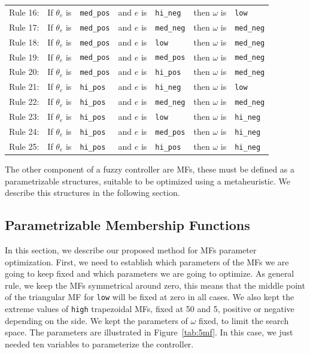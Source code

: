 \documentclass[symmetry,article,submit,moreauthors,pdftex]{Definitions/mdpi}
\begin{document}
\begin{specialtable}[H]
\begin{tabular}{lllllll}
    Rule 16: & If $\theta_e$ is	& { \tt med\_pos} &	and $e$ is	& { \tt hi\_neg}  &	then $\omega$ is & { \tt low}      \\
    Rule 17: & If $\theta_e$ is	& { \tt med\_pos} &	and $e$ is	& { \tt med\_neg} &	then $\omega$ is & { \tt med\_neg} \\
    Rule 18: & If $\theta_e$ is	& { \tt med\_pos} &	and $e$ is	& { \tt low}      &	then $\omega$ is & { \tt med\_neg} \\
    Rule 19: & If $\theta_e$ is	& { \tt med\_pos} &	and $e$ is	& { \tt med\_pos} &	then $\omega$ is & { \tt med\_neg} \\
    Rule 20: & If $\theta_e$ is	& { \tt med\_pos} &	and $e$ is  & { \tt hi\_pos}  &	then $\omega$ is & { \tt med\_neg} \\
    Rule 21: & If $\theta_e$ is	& { \tt hi\_pos}  &	and $e$ is	& { \tt hi\_neg}  &	then $\omega$ is & { \tt low}      \\
    Rule 22: & If $\theta_e$ is	& { \tt hi\_pos}  &	and $e$ is	& { \tt med\_neg} &	then $\omega$ is & { \tt med\_neg} \\
    Rule 23: & If $\theta_e$ is	& { \tt hi\_pos}  &	and $e$ is	& { \tt low}      &	then $\omega$ is & { \tt hi\_neg}  \\
    Rule 24: & If $\theta_e$ is	& { \tt hi\_pos}  &	and $e$ is	& { \tt med\_pos} &	then $\omega$ is & { \tt hi\_neg}  \\
    Rule 25: & If $\theta_e$ is	& { \tt hi\_pos}  &	and $e$ is	& { \tt hi\_pos}  &	then $\omega$ is & { \tt hi\_neg}    
    \end{tabular}
 \end{specialtable}

The other component of a fuzzy controller are MFs, these must be defined as a parametrizable structures, 
suitable to be optimized using a metaheuristic. We describe this structures in the following section.

\subsection{Parametrizable Membership Functions}%
    \label{sec:GA}

In this section, we describe our proposed method for MFs parameter
optimization. First, we need to establish which parameters of the MFs we are
going to keep fixed and which parameters we are going to optimize. As general
rule, we keep the MFs symmetrical around zero, this means that the middle point
of the triangular MF for { \tt low} will be fixed at zero in all cases. We also
kept the extreme values of {\tt high} trapezoidal MFs, fixed at 50 and 5,
positive or negative depending on the side. We kept the parameters of $\omega$
fixed, to limit the search space. The parameters are illustrated in
Figure~\ref{tab:5mf}. In this case, we just needed ten variables to
parameterize the controller.
\end{document}

